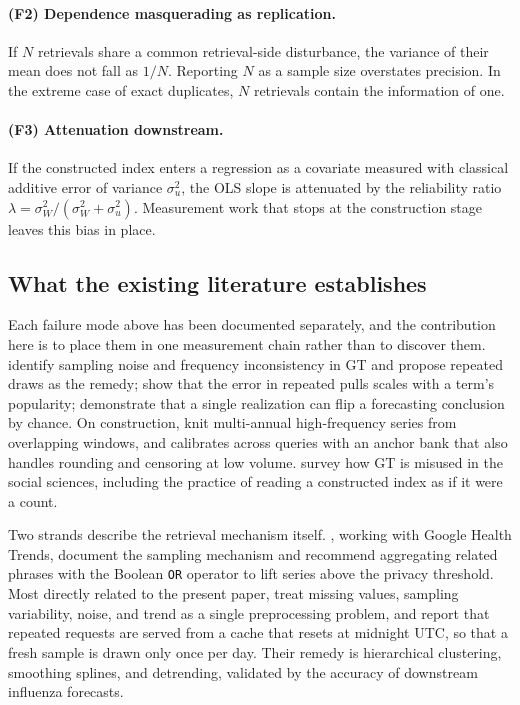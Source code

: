 \documentclass[12pt,a4paper,oneside]{article}
\begin{document}
\paragraph{(F2) Dependence masquerading as replication.} If $N$ retrievals share
a common retrieval-side disturbance, the variance of their mean does not fall as
$1/N$. Reporting $N$ as a sample size overstates precision. In the extreme case
of exact duplicates, $N$ retrievals contain the information of one.

\paragraph{(F3) Attenuation downstream.} If the constructed index enters a
regression as a covariate measured with classical additive error of variance
$\sigma^2_u$, the OLS slope is attenuated by the reliability ratio
$\lambda = \sigma^2_W/(\sigma^2_W + \sigma^2_u)$. Measurement work that stops at
the construction stage leaves this bias in place.

\subsection{What the existing literature establishes}\label{sec:related}

Each failure mode above has been documented separately, and the contribution
here is to place them in one measurement chain rather than to discover them.
\citet{EichenauerIMS2022} identify sampling noise and frequency inconsistency in
GT and propose repeated draws as the remedy; \citet{CebrianDomenech2024} show
that the error in repeated pulls scales with a term's popularity;
\citet{MedeirosPires2021} demonstrate that a single realization can flip a
forecasting conclusion by chance. On construction, \citet{BleherDimpfl2022} knit
multi-annual high-frequency series from overlapping windows, and
\citet{West2020} calibrates across queries with an anchor bank that also handles
rounding and censoring at low volume. \citet{Holzl2025} survey how GT is
misused in the social sciences, including the practice of reading a constructed
index as if it were a count.

Two strands describe the retrieval mechanism itself. \citet{Neumann2023}, working
with Google Health Trends, document the sampling mechanism and recommend
aggregating related phrases with the Boolean \texttt{OR} operator to lift series
above the privacy threshold. Most directly related to the present paper,
\citet{Djorno2026} treat missing values, sampling variability, noise, and trend
as a single preprocessing problem, and report that repeated requests are served
from a cache that resets at midnight UTC, so that a fresh sample is drawn only
once per day. Their remedy is hierarchical clustering, smoothing splines, and
detrending, validated by the accuracy of downstream influenza forecasts.
\end{document}
